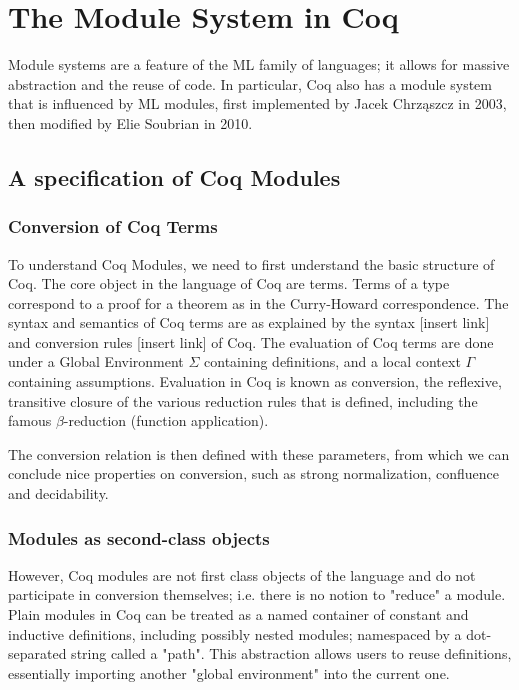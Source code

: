 \chapter{The Module System in Coq}
Module systems are  a feature of the ML family of languages; it allows
for massive abstraction and the reuse of code. In particular, Coq 
also has a module system that is influenced by ML modules, first 
implemented by Jacek Chrząszcz in 2003, then modified by Elie Soubrian
in 2010.

\section{A specification of Coq Modules}

\subsection{Conversion of Coq Terms}
To understand Coq Modules, we need to first understand the basic structure of 
Coq. The core object in the language of Coq are terms. Terms of a type
correspond to a proof for a theorem as in the Curry-Howard correspondence.
The syntax and semantics of Coq terms are as explained by the syntax
[insert link] and conversion rules [insert link] of Coq. The evaluation of Coq
terms are done under a Global Environment $\Sigma$ containing definitions,
and a local context $\Gamma$ containing assumptions. Evaluation in Coq is known
as conversion, the reflexive, transitive closure of the various reduction rules
that is defined, including the famous $\beta$-reduction (function application).

The conversion relation is then defined with these parameters, from which we can
conclude nice properties on conversion, such as strong normalization, confluence
and decidability.

\subsection{Modules as second-class objects}
However, Coq modules are not first class objects of the language and do not
participate in conversion themselves; i.e. there is no notion to "reduce" a
module. Plain modules in Coq can be treated as a named container of constant
and inductive definitions, including possibly nested modules; namespaced by a 
dot-separated string called a "path". This abstraction allows users to reuse
definitions, essentially importing another "global environment" into the current
one.

